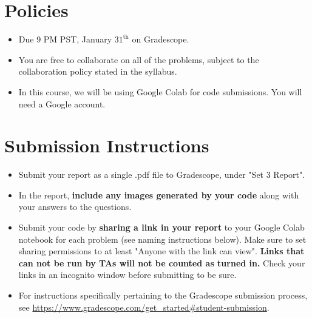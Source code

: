 \newif\ifshowsolutions
\showsolutionstrue

%







\pagestyle{fancy}




\section*{Policies}
\begin{itemize}
	\item Due 9 PM PST, January $31^\text{th}$ on Gradescope. 
	\item You are free to collaborate on all of the problems, subject to the collaboration policy stated in the syllabus.
	\item In this course, we will be using Google Colab for code submissions. You will need a Google account.
\end{itemize}

\section*{Submission Instructions}
\begin{itemize}
	\item Submit your report as a single .pdf file to Gradescope, under "Set 3 Report". 
	\item In the report, \textbf{include any images generated by your code} along with your answers to the questions.
	\item Submit your code by \textbf{sharing a link in your report} to your Google Colab notebook for each problem (see naming instructions below). Make sure to set sharing permissions to at least "Anyone with the link can view". \textbf{Links that can not be run by TAs will not be counted as turned in.} Check your links in an incognito window before submitting to be sure. 
	\item For instructions specifically pertaining to the Gradescope submission process, see \url{https://www.gradescope.com/get_started#student-submission}.
\end{itemize}

